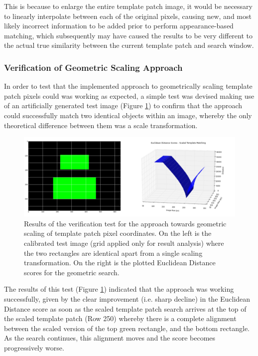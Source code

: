 This is because to enlarge the entire template patch image, it would be necessary to linearly interpolate between each of the original pixels, causing new, and most likely incorrect information to be added prior to perform appearance-based matching, which subsequently may have caused the results to be very different to the actual true similarity between the current template patch and search window.

\subsubsection{Verification of Geometric Scaling Approach}

In order to test that the implemented approach to geometrically scaling template patch pixels could was working as expected, a simple test was devised making use of an artificially generated test image (Figure \ref{fig:graphpic}) to confirm that the approach could successfully match two identical objects within an image, whereby the only theoretical difference between them was a scale transformation.

\begin{figure}[ht!]
\centering
\includegraphics[scale=0.3]{images/3d_graph.pdf}
  \caption{Results of the verification test for the approach towards geometric scaling of template patch pixel coordinates. On the left is the calibrated test image (grid applied only for result analysis) where the two rectangles are identical apart from a single scaling transformation. On the right is the plotted Euclidean Distance scores for the geometric search.}
\label{fig:graphpic}
\end{figure} 

The results of this test (Figure \ref{fig:graphpic}) indicated that the approach was working successfully, given by the clear improvement (i.e. sharp decline) in the Euclidean Distance score as soon as the scaled template patch search arrives at the top of the scaled template patch (Row 250) whereby there is a complete alignment between the scaled version of the top green rectangle, and the bottom rectangle. As the search continues, this alignment moves and the score becomes progressively worse.
